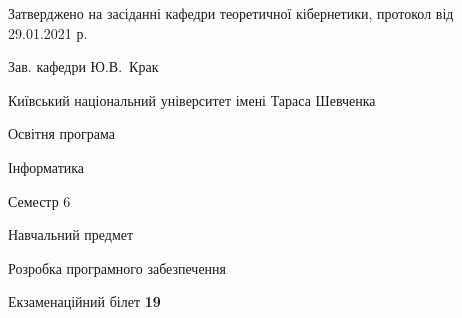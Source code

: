 \documentclass[10pt, ukrainian]{article}
\begin{document}
{\vspace{5mm}\smallskip \begin {small} Затверджено на засіданні кафедри теоретичної кібернетики, протокол  від   29.01.2021 р.\par\smallskip\smallskip
{\parbox {6.5 cm}{Зав. кафедри \dotfill Ю.В.~Крак}} \end{small}}
\newpage

{{\begin {small}\par
{ \center  Київський національний університет імені Тараса Шевченка \par}
{\parbox {5 cm}{Освітня програма \hfill}{\parbox {7 cm}{Інформатика \hfill}}\parbox {6 cm}{\hfill Семестр 6}}\par
{\parbox {5 cm} {Навчальний предмет \hfill}\parbox {7 cm}{Розробка програмного забезпечення \hfill}\parbox {6cm}{\hfill}\par}\vspace{-7pt} \end{small}}{\center Екзаменаційний білет \No \textbf
{ 19 }\par}}
\end{document}
